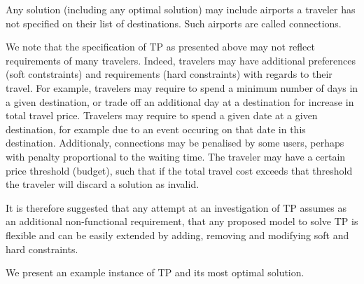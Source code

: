 \documentclass{article}
\theoremstyle{definition}
\begin{document}
Any solution (including any optimal solution) may include airports a traveler has not specified on their list of destinations. Such airports are called connections.

We note that the specification of TP as presented above may not reflect requirements of many travelers. Indeed, travelers may have additional preferences (soft contstraints) and requirements (hard constraints) with regards to their travel. For example, travelers may require to spend a minimum number of days in a given destination, or trade off an additional day at a destination for increase in total travel price. Travelers may require to spend a given date at a given destination, for example due to an event occuring on that date in this destination. Additionaly, connections may be penalised by some users, perhaps with penalty proportional to the waiting time. The traveler may have a certain price threshold (budget), such that if the total travel cost exceeds that threshold the traveler will discard a solution as invalid.

It is therefore suggested that any attempt at an investigation of TP assumes as an additional non-functional requirement, that any proposed model to solve TP is flexible and can be easily extended by adding, removing and modifying soft and hard constraints.


We present an example instance of TP and its most optimal solution.
\end{document}
